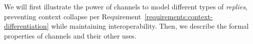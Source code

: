 We will first illustrate the power of channels
to model different types of \emph{replies},
preventing context collapse per Requirement~\ref{requirements:context-differentiation}
while maintaining interoperability.
Then, we describe the formal properties of channels and their other uses.










